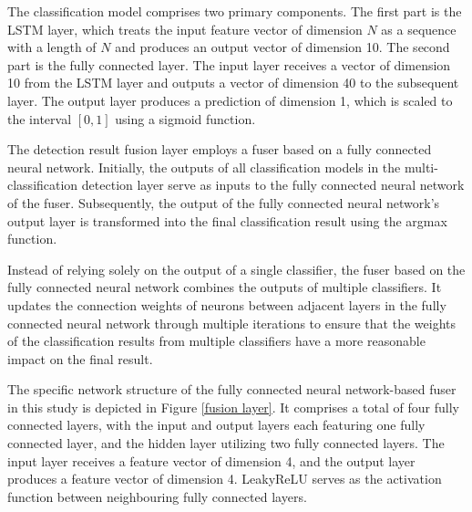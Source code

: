 \documentclass[journal]{IEEEtai}
\begin{document}
The classification model comprises two primary components. 
The first part is the LSTM layer, which treats the input feature vector of dimension $N$ as a sequence with a length of $N$ and produces an output vector of dimension 10. 
The second part is the fully connected layer. 
The input layer receives a vector of dimension 10 from the LSTM layer and outputs a vector of dimension 40 to the subsequent layer. 
The output layer produces a prediction of dimension 1, which is scaled to the interval $[0, 1]$ using a sigmoid function.

The detection result fusion layer employs a fuser based on a fully connected neural network. 
Initially, the outputs of all classification models in the multi-classification detection layer serve as inputs to the fully connected neural network of the fuser. 
Subsequently, the output of the fully connected neural network's output layer is transformed into the final classification result using the argmax function.

Instead of relying solely on the output of a single classifier, the fuser based on the fully connected neural network combines the outputs of multiple classifiers. 
It updates the connection weights of neurons between adjacent layers in the fully connected neural network through multiple iterations to ensure that the weights of the classification results from multiple classifiers have a more reasonable impact on the final result.

The specific network structure of the fully connected neural network-based fuser in this study is depicted in Figure \ref{fusion layer}. 
It comprises a total of four fully connected layers, with the input and output layers each featuring one fully connected layer, and the hidden layer utilizing two fully connected layers. 
The input layer receives a feature vector of dimension 4, and the output layer produces a feature vector of dimension 4. 
LeakyReLU serves as the activation function between neighbouring fully connected layers.
\end{document}

